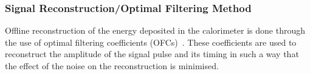 %






%
%
%
%
%










%
%




%
%
%


\subsubsection{Signal Reconstruction/Optimal Filtering Method}
\label{sec_signal_rec_OFC}
Offline reconstruction of the energy deposited in the calorimeter is done through the use of optimal filtering coefficients (OFCs)~\cite{OFC_paper}. These coefficients are used to reconstruct the amplitude of the signal pulse and its timing in such a way that the effect of the noise on the reconstruction is minimised. 
%

